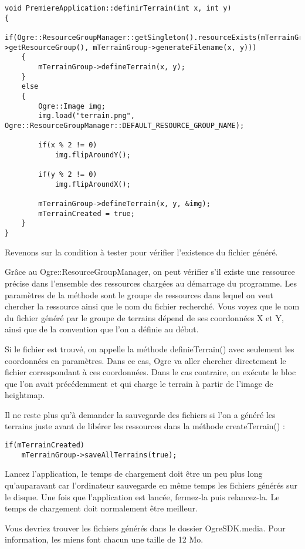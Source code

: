 \begin{lstlisting}[caption={}]
void PremiereApplication::definirTerrain(int x, int y)
{
    if(Ogre::ResourceGroupManager::getSingleton().resourceExists(mTerrainGroup->getResourceGroup(), mTerrainGroup->generateFilename(x, y)))
    {
        mTerrainGroup->defineTerrain(x, y);
    }
    else
    {
        Ogre::Image img;
        img.load("terrain.png", Ogre::ResourceGroupManager::DEFAULT_RESOURCE_GROUP_NAME);

        if(x % 2 != 0)
            img.flipAroundY();

        if(y % 2 != 0)
            img.flipAroundX();

        mTerrainGroup->defineTerrain(x, y, &img);
        mTerrainCreated = true;
    }
}
\end{lstlisting}

Revenons sur la condition \`a tester pour v\'erifier l'existence du fichier g\'en\'er\'e.

Gr\^ace au Ogre::ResourceGroupManager, on peut v\'erifier s'il existe une ressource pr\'ecise dans l'ensemble des ressources charg\'ees au d\'emarrage du programme. Les param\`etres de la m\'ethode sont le groupe de ressources dans lequel on veut chercher la ressource ainsi que le nom du fichier recherch\'e. Vous voyez que le nom du fichier g\'en\'er\'e par le groupe de terrains d\'epend de ses coordonn\'ees X et Y, ainsi que de la convention que l'on a d\'efinie au d\'ebut.

Si le fichier est trouv\'e, on appelle la m\'ethode definieTerrain() avec seulement les coordonn\'ees en param\`etres. Dans ce cas, Ogre va aller chercher directement le fichier correspondant \`a ces coordonn\'ees. Dans le cas contraire, on ex\'ecute le bloc que l'on avait pr\'ec\'edemment et qui charge le terrain \`a partir de l'image de heightmap.

Il ne reste plus qu'\`a demander la sauvegarde des fichiers si l'on a g\'en\'er\'e les terrains juste avant de lib\'erer les ressources dans la m\'ethode createTerrain() :

\begin{lstlisting}[caption={}]
if(mTerrainCreated)
    mTerrainGroup->saveAllTerrains(true);
\end{lstlisting}


Lancez l'application, le temps de chargement doit \^etre un peu plus long qu'auparavant car l'ordinateur sauvegarde en m\^eme temps les fichiers g\'en\'er\'es sur le disque. Une fois que l'application est lanc\'ee, fermez-la puis relancez-la. Le temps de chargement doit normalement \^etre meilleur.

Vous devriez trouver les fichiers g\'en\'er\'es dans le dossier OgreSDK.media. Pour information, les miens font chacun une taille de 12 Mo.
























